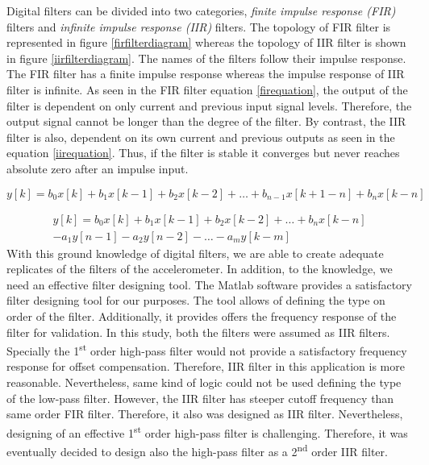 \documentclass[english,12pt,a4paper,pdftex,elec,utf8]{aaltothesis}
\begin{document}
Digital filters can be divided into two categories, \textit{finite impulse response (FIR)} filters and \textit{infinite impulse response (IIR)} filters. The topology of FIR filter is represented in figure \ref{firfilterdiagram} whereas the topology of IIR filter is shown in figure \ref{iirfilterdiagram}. The names of the filters follow their impulse response. The FIR filter has a finite impulse response whereas the impulse response of IIR filter is infinite. As seen in the FIR filter equation \ref{firequation}, the output of the filter is dependent on only current and previous input signal levels. Therefore, the output signal cannot be longer than the degree of the filter. By contrast, the IIR filter is also, dependent on its own current and previous outputs as seen in the equation \ref{iirequation}. Thus, if the filter is stable it converges but never reaches absolute zero after an impulse input.




\begin{equation} \label{firequation}
y[k] = b_0 x[k] + b_1 x[k-1] + b_2 x[k-2] + \dots + b_{n-1} x[k+1-n] + b_n x[k-n]
\end{equation}



\begin{equation} \label{iirequation}
\begin{aligned}
y[k] = b_0 x[k] + b_1 x[k-1] + b_2 x[k-2] + \dots + b_n x[k-n] \\
-a_1 y[n-1] - a_2 y[n-2] - \dots - a_m y[k-m]
\end{aligned}
\end{equation}
With this ground knowledge of digital filters, we are able to create adequate replicates of the filters of the accelerometer. In addition, to the knowledge, we need an effective filter designing tool. The Matlab software provides a satisfactory filter designing tool \cite{matlabfilterdesigner} for our purposes. The tool allows of defining the type on order of the filter. Additionally, it provides offers the frequency response of the filter for validation. In this study, both the filters were assumed as IIR filters. Specially the 1\textsuperscript{st} order high-pass filter would not provide a satisfactory frequency response for offset compensation. Therefore, IIR filter in this application is more reasonable. Nevertheless, same kind of logic could not be used defining the type of the low-pass filter. However, the IIR filter has steeper cutoff frequency than same order FIR filter. Therefore, it also was designed as IIR filter. Nevertheless, designing of an effective 1\textsuperscript{st} order high-pass filter is challenging. Therefore, it was eventually decided to design also the high-pass filter as a 2\textsuperscript{nd} order IIR filter.
\end{document}
